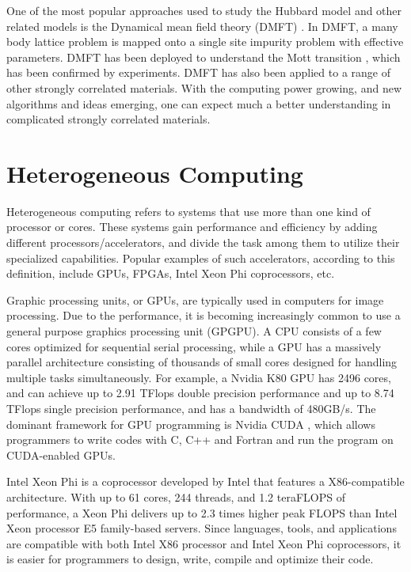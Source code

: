 One of the most popular approaches used to study the Hubbard model and other related
models is the Dynamical mean field theory (DMFT)
\cite{PhysRevB.45.6479,PhysRevLett.69.168,RevModPhys.68.13,PhysRevLett.69.1236,PhysRevLett.69.1240}. 
In DMFT, a many body lattice
problem is mapped onto a single site impurity problem with effective parameters.
DMFT has been deployed to understand the Mott transition 
\cite{PhysRevLett.69.1796,PhysRevLett.70.1666,PhysRevB.48.7167},
which has been confirmed
by experiments\cite{PhysRevLett.75.105,PhysRevB.58.3690,PhysRevLett.90.186403}. 
DMFT has also been applied to a range of other strongly correlated 
materials. With the computing power growing, and new algorithms and ideas emerging, 
one can expect much a better understanding in complicated strongly correlated 
materials.

\section{Heterogeneous Computing}
Heterogeneous computing refers to systems that use more than one kind of 
processor or cores. These systems gain performance and efficiency by adding
different processors/accelerators, and divide the task among them to utilize 
their specialized capabilities. 
Popular examples of such accelerators, according to this definition, include 
GPUs, FPGAs, Intel Xeon Phi coprocessors, etc.


Graphic processing units, or GPUs, are typically used in computers for image 
processing. 
Due to the performance, it is becoming increasingly common to use a general purpose 
graphics processing unit (GPGPU).
A CPU consists of a few cores optimized for sequential serial processing,
while a GPU has a massively parallel architecture 
consisting of thousands of small cores designed for handling multiple tasks 
simultaneously.
For example, a Nvidia K80 GPU \cite{nv_k80_spec} has 2496 cores, and can achieve up to 2.91 TFlops 
double precision performance and up to 8.74 TFlops single precision performance, 
and has a bandwidth of 480GB/s.
The dominant framework for GPU programming is Nvidia CUDA \cite{Nickolls:2008:SPP:1365490.1365500}, which allows 
programmers to write codes with C, C++ and Fortran and run the program on CUDA-enabled 
GPUs.


Intel Xeon Phi\cite{Jeffers:2013:IXP:2523262} is a coprocessor developed by Intel that features a 
X86-compatible architecture. With up to 61 cores, 244 threads, 
and 1.2 teraFLOPS of performance, a Xeon Phi delivers up to 2.3 times higher 
peak FLOPS than Intel Xeon processor E5 family-based servers.
Since languages, tools, and applications are compatible with both Intel X86 
processor and Intel Xeon Phi coprocessors, it is easier for programmers to
design, write, compile and optimize their code. 


